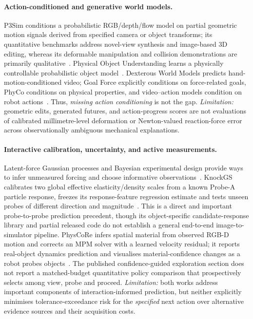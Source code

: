 \documentclass[10pt,twocolumn,letterpaper]{article}
\begin{document}
\paragraph{Action-conditioned and generative world models.}
P3Sim conditions a probabilistic RGB/depth/flow model on partial geometric motion signals derived from specified camera or object transforms; its quantitative benchmarks address novel-view synthesis and image-based 3D editing, whereas its deformable manipulation and collision demonstrations are primarily qualitative~\cite{lee2026p3sim}. Physical Object Understanding learns a physically controllable probabilistic object model~\cite{venkatesh2026physicalwm}. Dexterous World Models predicts hand-motion-conditioned video; Goal Force explicitly conditions on force-related goals, PhyCo conditions on physical properties, and video--action models condition on robot actions~\cite{kim2026dexterous,gillman2026goalforce,narayanan2026phyco,zhou2026tauwm}. Thus, \emph{missing action conditioning} is not the gap. \emph{Limitation:} geometric edits, generated futures, and action-progress scores are not evaluations of calibrated millimetre-level deformation or Newton-valued reaction-force error across observationally ambiguous mechanical explanations.

\paragraph{Interactive calibration, uncertainty, and active measurements.}
Latent-force Gaussian processes and Bayesian experimental design provide ways to infer unmeasured forcing and choose informative observations~\cite{alvarez2009latent,nayek2019joint,rogers2020joint,attia2018goal}. KnockGS calibrates two global effective elasticity/density scales from a known Probe-A particle response, freezes its response-feature regression estimate and tests unseen probes of different direction and magnitude~\cite{ge2026knockgs}. This is a direct and important probe-to-probe prediction precedent, though its object-specific candidate-response library and partial released code do not establish a general end-to-end image-to-simulator pipeline. PhysCoRe infers spatial material from observed RGB-D motion and corrects an MPM solver with a learned velocity residual; it reports real-object dynamics prediction and visualises material-confidence changes as a robot probes objects~\cite{yin2026physcore}. The published confidence-guided exploration section does not report a matched-budget quantitative policy comparison that prospectively selects among view, probe and proceed. \emph{Limitation:} both works address important components of interaction-informed prediction, but neither explicitly minimises tolerance-exceedance risk for the \emph{specified} next action over alternative evidence sources and their acquisition costs.
\end{document}
